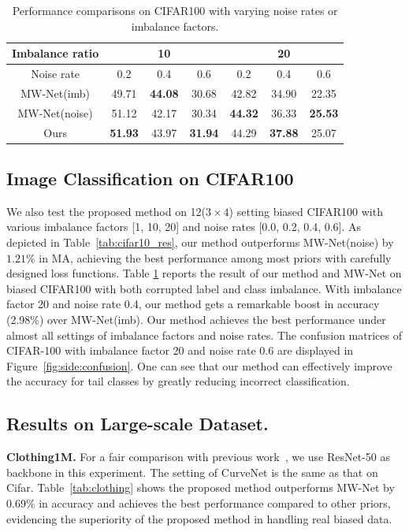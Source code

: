 \documentclass[letterpaper]{article} %
\newcommand{\bd}[1]{\textbf{#1}}
\begin{document}
\begin{table}[t]
\begin{center}
\begin{adjustbox}{max width=0.47\textwidth}
    \begin{tabular}{c|c|c|c|c|c|c}
    \hline
    Imbalance ratio &  \multicolumn{3}{c|}{10}    & \multicolumn{3}{c}{20} \\
    \hline
    Noise rate & 0.2   & 0.4   & \multicolumn{1}{c|}{0.6} & 0.2   & 0.4   & \multicolumn{1}{c}{0.6} \\
    \hline
    MW-Net(imb) & 49.71  & \textbf{44.08 } & 30.68  & 42.82  & 34.90  & 22.35  \\
    \hline
    MW-Net(noise) & 51.12  & 42.17  & 30.34  & \textbf{44.32}  & 36.33  & \textbf{25.53 } \\
    \hline
    Ours  & \textbf{51.93 } & 43.97  & \textbf{31.94 } & 44.29  & \textbf{37.88 } & 25.07  \\
    \hline
    \end{tabular}%
\end{adjustbox}
\caption{Performance comparisons on CIFAR100 with varying noise rates or imbalance factors.
}
\label{tab:cifar100_res_d}
\end{center}
\end{table}

\subsection{Image Classification on CIFAR100}
We also test the proposed method on 12($3 \times 4$) setting biased CIFAR100 with various imbalance factors [1, 10, 20] and noise rates [0.0, 0.2, 0.4, 0.6].
As depicted in Table~\ref{tab:cifar10_res}, our method outperforms MW-Net(noise) by $1.21\%$ in MA, achieving the best performance among most priors with carefully designed loss functions.
Table \ref{tab:cifar100_res_d} reports the result of our method and MW-Net on biased CIFAR100 with both corrupted label and class imbalance.
With imbalance factor 20 and noise rate 0.4, our method gets a remarkable boost in accuracy (2.98\%) over MW-Net(imb).
Our method achieves the best performance under almost all settings of imbalance factors and noise rates.
The confusion matrices of CIFAR-100 with imbalance factor 20 and noise rate 0.6 are displayed in Figure~\ref{fig:side:confusion}.
One can see that our method can effectively improve the accuracy for tail classes by greatly reducing incorrect classification.

\subsection{Results on Large-scale Dataset.}
\noindent\bd{Clothing1M.}
For a fair comparison with previous work~\cite{shu2019meta}, we use ResNet-50 as backbone in this experiment.
The setting of CurveNet is the same as that on Cifar.
Table~\ref{tab:clothing} shows the proposed method outperforms MW-Net by 0.69\% in accuracy and achieves the best performance compared to other priors, evidencing the superiority of the proposed method in handling real biased data.
\end{document}
